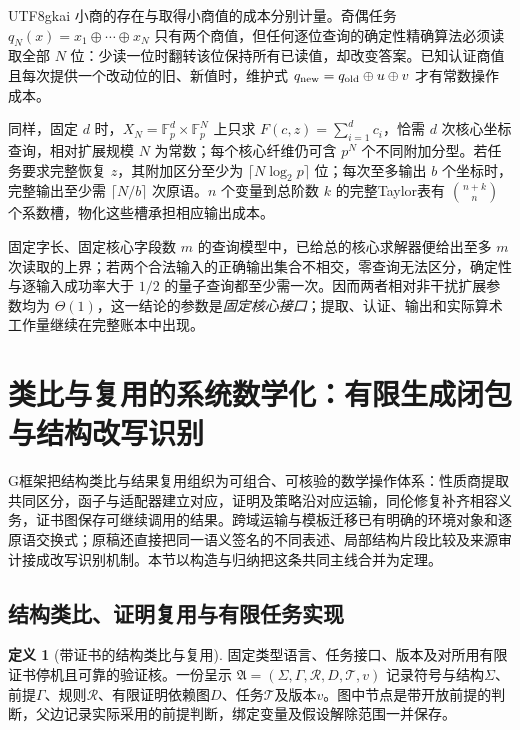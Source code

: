 \documentclass[11pt,a4paper]{article}
\theoremstyle{plain}
\theoremstyle{definition}
\newtheorem{definition}[theorem]{定义}
\theoremstyle{remark}
\begin{document}
\begin{CJK*}{UTF8}{gkai}
小商的存在与取得小商值的成本分别计量。奇偶任务 $q_N(x)=x_1\oplus\cdots\oplus x_N$ 只有两个商值，但任何逐位查询的确定性精确算法必须读取全部 $N$ 位：少读一位时翻转该位保持所有已读值，却改变答案。已知认证商值且每次提供一个改动位的旧、新值时，维护式 $q_{\rm new}=q_{\rm old}\oplus u\oplus v$ 才有常数操作成本。

同样，固定 $d$ 时，$X_N=\mathbb F_p^d\times\mathbb F_p^N$ 上只求 $F(c,z)=\sum_{i=1}^dc_i$，恰需 $d$ 次核心坐标查询，相对扩展规模 $N$ 为常数；每个核心纤维仍可含 $p^N$ 个不同附加分型。若任务要求完整恢复 $z$，其附加区分至少为 $\lceil N\log_2p\rceil$ 位；每次至多输出 $b$ 个坐标时，完整输出至少需 $\lceil N/b\rceil$ 次原语。$n$ 个变量到总阶数 $k$ 的完整Taylor表有 $\binom{n+k}{n}$ 个系数槽，物化这些槽承担相应输出成本。

固定字长、固定核心字段数 $m$ 的查询模型中，已给总的核心求解器便给出至多 $m$ 次读取的上界；若两个合法输入的正确输出集合不相交，零查询无法区分，确定性与逐输入成功率大于 $1/2$ 的量子查询都至少需一次。因而两者相对非干扰扩展参数均为 $\Theta(1)$，这一结论的参数是\emph{固定核心接口}；提取、认证、输出和实际算术工作量继续在完整账本中出现。

\section{类比与复用的系统数学化：有限生成闭包与结构改写识别}
\label{ar:framework}

G框架把结构类比与结果复用组织为可组合、可核验的数学操作体系：性质商提取共同区分，函子与适配器建立对应，证明及策略沿对应运输，同伦修复补齐相容义务，证书图保存可继续调用的结果。跨域运输与模板迁移已有明确的环境对象和逐原语交换式\cite{S04,S13,S14}；原稿还直接把同一语义签名的不同表述、局部结构片段比较及来源审计接成改写识别机制\cite{S12,S20,S38}。本节以构造与归纳把这条共同主线合并为定理。

\subsection{结构类比、证明复用与有限任务实现}
\label{ar:transport}

\begin{definition}[带证书的结构类比与复用]
固定类型语言、任务接口、版本及对所用有限证书停机且可靠的验证核。一份呈示
$\mathfrak A=(\Sigma,\Gamma,\mathcal R,D,\mathcal T,v)$
记录符号与结构$\Sigma$、前提$\Gamma$、规则$\mathcal R$、有限证明依赖图$D$、任务$\mathcal T$及版本$v$。图中节点是带开放前提的判断，父边记录实际采用的前提判断，绑定变量及假设解除范围一并保存。


\end{definition}
\end{CJK*}
\end{document}
